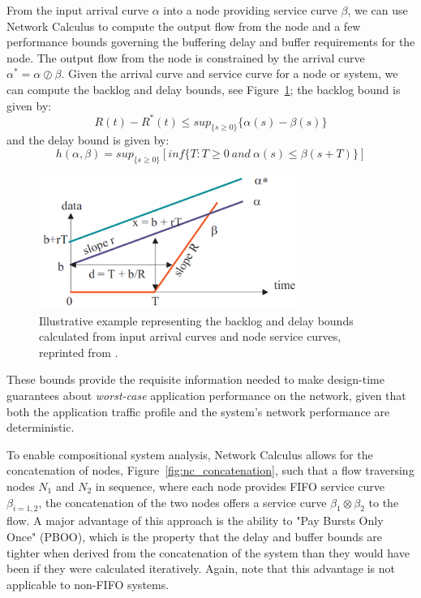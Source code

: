 From the input arrival curve $\alpha$ into a node providing service curve $\beta$, we can use Network Calculus to compute the output flow from the node and a few performance bounds governing the buffering delay and buffer requirements for the node.  The output flow from the node is constrained by the arrival curve $\alpha^* = \alpha\oslash\beta$.  Given the arrival curve and service curve for a node or system, we can compute the backlog and delay bounds, see Figure~\ref{fig:nc_bounds}; the backlog bound is given by:
\begin{equation}
R(t)-R^*(t)\leq sup_{\{s\geq 0\}}\{\alpha(s)-\beta(s)\}
\end{equation}
and the delay bound is given by: 
\begin{equation}
h(\alpha,\beta)=sup_{\{s\geq0\}}[inf\{T:T\geq0\ and\  \alpha(s)\leq\beta(s+T)\}]
\end{equation}

\begin{figure}[htb]
	\centering
	\includegraphics[width=0.75\textwidth]{figs/nc_bounds.png}
	\caption{Illustrative example representing the backlog and delay bounds calculated from input arrival curves and node service curves, reprinted from \cite{NCBook}.}
	\label{fig:nc_bounds}
\end{figure}

These bounds provide the requisite information needed to make design-time guarantees about \emph{worst-case} application performance on the network, given that both the application traffic profile and the system's network performance are deterministic. 

To enable compositional system analysis, Network Calculus allows for the concatenation of nodes, Figure~\ref{fig:nc_concatenation}, such that a flow traversing nodes $N_1$ and $N_2$ in sequence, where each node provides FIFO service curve $\beta_{i=1,2}$, the concatenation of the two nodes offers a service curve $\beta_1\otimes\beta_2$ to the flow.  A major advantage of this approach is the ability to "Pay Bursts Only Once" (PBOO), which is the property that the delay and buffer bounds are tighter when derived from the concatenation of the system than they would have been if they were calculated iteratively.  Again, note that this advantage is not applicable to non-FIFO systems\cite{NCBook}.  


